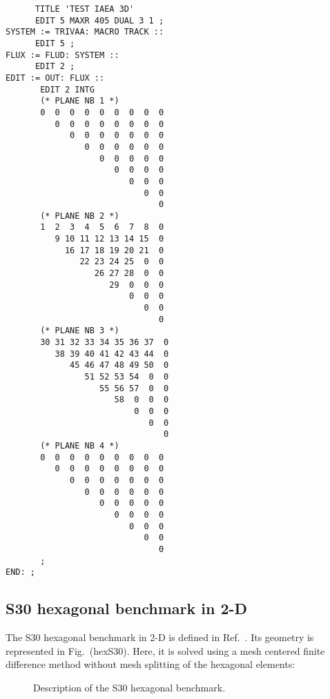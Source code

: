 \begin{verbatim}
      TITLE 'TEST IAEA 3D'
      EDIT 5 MAXR 405 DUAL 3 1 ;
SYSTEM := TRIVAA: MACRO TRACK ::
      EDIT 5 ;
FLUX := FLUD: SYSTEM ::
      EDIT 2 ;
EDIT := OUT: FLUX ::
       EDIT 2 INTG
       (* PLANE NB 1 *) 
       0  0  0  0  0  0  0  0  0 
          0  0  0  0  0  0  0  0 
             0  0  0  0  0  0  0 
                0  0  0  0  0  0 
                   0  0  0  0  0
                      0  0  0  0
                         0  0  0
                            0  0
                               0
       (* PLANE NB 2 *) 
       1  2  3  4  5  6  7  8  0 
          9 10 11 12 13 14 15  0 
            16 17 18 19 20 21  0 
               22 23 24 25  0  0 
                  26 27 28  0  0
                     29  0  0  0
                         0  0  0
                            0  0
                               0
       (* PLANE NB 3 *) 
       30 31 32 33 34 35 36 37  0 
          38 39 40 41 42 43 44  0 
             45 46 47 48 49 50  0 
                51 52 53 54  0  0 
                   55 56 57  0  0
                      58  0  0  0
                          0  0  0
                             0  0
                                0
       (* PLANE NB 4 *) 
       0  0  0  0  0  0  0  0  0 
          0  0  0  0  0  0  0  0 
             0  0  0  0  0  0  0 
                0  0  0  0  0  0 
                   0  0  0  0  0
                      0  0  0  0
                         0  0  0
                            0  0
                               0
       ;
END: ;
\end{verbatim}

\subsection{S30 hexagonal benchmark in 2-D}

The S30 hexagonal benchmark in 2-D is defined in Ref.~. Its geometry is represented in Fig.~\fig(hexS30). Here, it is solved using a mesh centered finite difference method without mesh splitting of the hexagonal elements:

\begin{figure}[htbp]
\begin{center} 
\epsfxsize=6cm
\centerline{ }
\parbox{14cm}{\caption{Description of the S30 hexagonal benchmark.}\label{fig:hexS30}}  \end{center} 
\end{figure}

